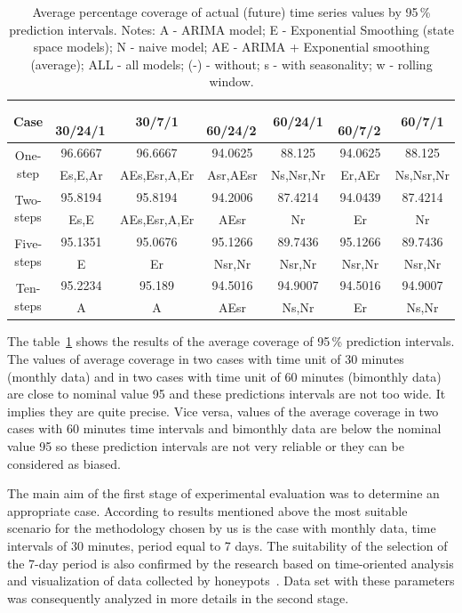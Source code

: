 \documentclass[runningheads]{llncs}
\begin{document}
\begin{table}[h]
    \centering
    \begin{tabular}{c|c|c|c|c|c|c} \hline
        Case & \,30/24/1\, & \,30/7/1\, & \,60/24/2\, & \,60/24/1\, & \,60/7/2\, & \,60/7/1\, \\
     \hline\hline
        \multirow{2}{*}{One-step} & 96.6667 & 96.6667 & 94.0625 & 88.125 & 94.0625 & 88.125 \\
        & Es,E,Ar & AEs,Esr,A,Er & Asr,AEsr & Ns,Nsr,Nr & Er,AEr & Ns,Nsr,Nr  \\
        \hline
        \multirow{2}{*}{Two-steps} & 95.8194 & 95.8194 & 94.2006 & 87.4214 & 94.0439 & 87.4214 \\
        & Es,E & AEs,Esr,A,Er & AEsr & Nr & Er & Nr \\
        \hline
        \multirow{2}{*}{Five-steps} & 95.1351 & 95.0676 & 95.1266 & 89.7436 & 95.1266 & 89.7436 \\
        & E & Er & Nsr,Nr & Nsr,Nr & Nsr,Nr & Nsr,Nr  \\
        \hline
        \multirow{2}{*}{Ten-steps} & 95.2234 & 95.189 & 94.5016 & 94.9007 & 94.5016 & 94.9007 \\
        & A & A &	AEsr & Ns,Nr & Er & Ns,Nr \\
        \hline
    \end{tabular}
    \caption{Average percentage coverage of actual (future) time series values by 95\,\% prediction intervals. Notes: A - ARIMA model; E - Exponential Smoothing (state space models); N - naive model; AE - ARIMA + Exponential smoothing (average); ALL - all models; (-) - without; s - with seasonality; w - rolling window.}
    \label{tab:avg_95}
\end{table}

The table~\ref{tab:avg_95} shows the results of the average coverage of 95\,\% prediction intervals. The values of average coverage in two cases with time unit of 30 minutes (monthly data) and in  two cases with time unit of 60 minutes (bimonthly data) are close to nominal value 95 and these predictions intervals are not too wide. It implies they are quite precise. Vice versa, values of the average coverage in two cases with 60 minutes time intervals and bimonthly data are below the nominal value 95 so these prediction intervals are not very reliable or they can be considered as biased.

The main aim of the first stage of  experimental evaluation was to determine an  appropriate case. According to results mentioned above the most suitable scenario for the methodology chosen by us is the case with monthly data, time intervals of 30 minutes, period equal to 7 days. The suitability of the selection of the 7-day period is also confirmed by the research based on time-oriented analysis and visualization of data collected by honeypots~\cite{sokol2015study}. Data set with these parameters was consequently analyzed in more details in the second stage.  
\end{document}
